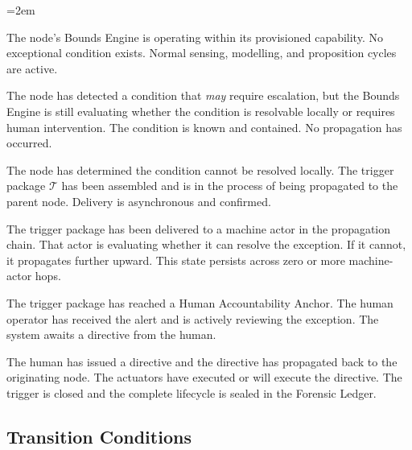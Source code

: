 \begin{trivlist}\itemindent=2em
\item[\textbf{IDLE}] The node's Bounds Engine is operating within its provisioned
  capability. No exceptional condition exists. Normal sensing, modelling, and
  proposition cycles are active.

\item[\textbf{BOUNDED}] The node has detected a condition that \emph{may} require
  escalation, but the Bounds Engine is still evaluating whether the condition is
  resolvable locally or requires human intervention. The condition is known and
  contained. No propagation has occurred.

\item[\textbf{BAIL\_PENDING}] The node has determined the condition cannot be
  resolved locally. The trigger package $\mathcal{T}$ has been assembled and is
  in the process of being propagated to the parent node. Delivery is asynchronous
  and confirmed.

\item[\textbf{ESCALATING}] The trigger package has been delivered to a machine
  actor in the propagation chain. That actor is evaluating whether it can resolve
  the exception. If it cannot, it propagates further upward. This state persists
  across zero or more machine-actor hops.

\item[\textbf{HUMAN\_ACKNOWLEDGED}] The trigger package has reached a Human
  Accountability Anchor. The human operator has received the alert and is actively
  reviewing the exception. The system awaits a directive from the human.

\item[\textbf{RESOLVED}] The human has issued a directive and the directive has
  propagated back to the originating node. The actuators have executed or will
  execute the directive. The trigger is closed and the complete lifecycle is
  sealed in the Forensic Ledger.
\end{trivlist}


\subsection{Transition Conditions}\label{sec:bailout-transitions}

